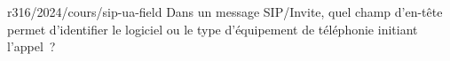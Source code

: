 \begin{question}{r316/2024/cours/sip-ua-field}
  Dans un message SIP/Invite, quel champ d'en-tête permet d'identifier
  le logiciel ou le type d'équipement de téléphonie
  initiant l'appel~?
  \begin{reponses}
  \end{reponses}
\end{question}
